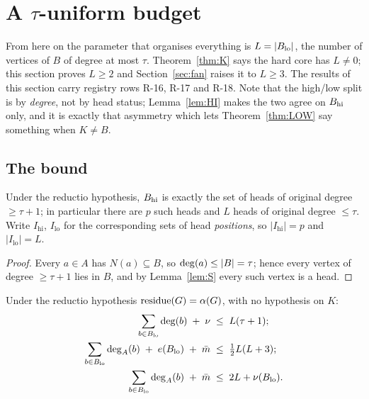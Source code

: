 \section{A \texorpdfstring{$\tau$}{tau}-uniform budget}\label{sec:budget}

From here on the parameter that organises everything is $L = |B_{\mathrm{lo}}|$, the number of
vertices of $B$ of degree at most $\tau$. Theorem~\ref{thm:K} says the hard core has
$L \ne 0$; this section proves $L \ge 2$ and Section~\ref{sec:fan} raises it to $L \ge 3$.
The results of this section carry registry rows R-16, R-17 and R-18. Note that the
high/low split is by \emph{degree}, not by head status; Lemma~\ref{lem:HI} makes the two
agree on $B_{\mathrm{hi}}$ only, and it is exactly that asymmetry which lets Theorem~\ref{thm:LOW}
say something when $K \ne B$.

\subsection{The bound}

\begin{lemma}\label{lem:HI}
Under the reductio hypothesis, $B_{\mathrm{hi}}$ is exactly the set of heads of original degree
$\ge \tau+1$; in particular there are $p$ such heads and $L$ heads of original degree
$\le \tau$. Write $I_{\mathrm{hi}}$, $I_{\mathrm{lo}}$ for the corresponding sets of head
\emph{positions}, so $|I_{\mathrm{hi}}| = p$ and $|I_{\mathrm{lo}}| = L$.
\end{lemma}

\begin{proof}
Every $a \in A$ has $N(a) \subseteq B$, so $\mathrm{deg}(a) \le |B| = \tau$; hence every vertex of
degree $\ge \tau+1$ lies in $B$, and by Lemma~\ref{lem:S} every such vertex is a head.
\end{proof}

\begin{theorem}\label{thm:LOW}
Under the reductio hypothesis $\operatorname{residue}(G) = \alpha(G)$, with no hypothesis on $K$:
\begin{align}
\sum_{b \in B_{\mathrm{lo}}} \mathrm{deg}(b) \;+\; \nu &\;\le\; L(\tau+1); \label{eq:LOW1}\\
\sum_{b \in B_{\mathrm{lo}}} \mathrm{deg}_A(b) \;+\; e(B_{\mathrm{lo}}) \;+\; \bar{m} &\;\le\; \tfrac{1}{2}L(L+3);
\label{eq:LOW2}\\
\sum_{b \in B_{\mathrm{lo}}} \mathrm{deg}_A(b) \;+\; \bar{m} &\;\le\; 2L + \nu(B_{\mathrm{lo}}). \label{eq:LOW3}
\end{align}
\end{theorem}

